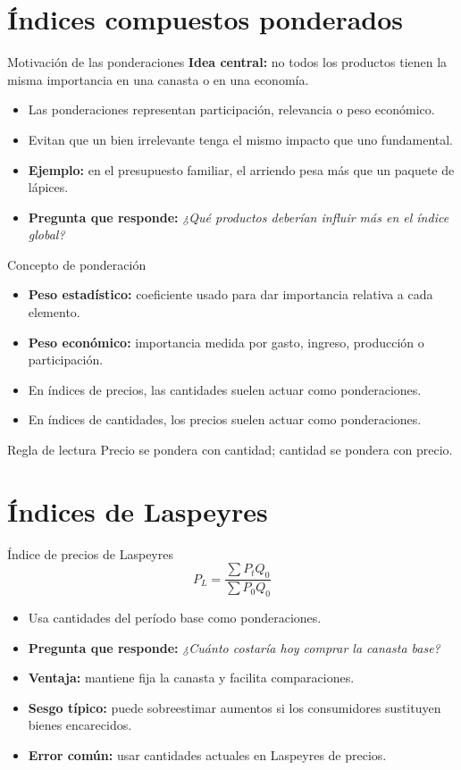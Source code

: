 \documentclass[aspectratio=169,11pt]{beamer}
\newcommand{\pregunta}[1]{\textbf{Pregunta que responde:} \emph{#1}}
\newcommand{\errorcomun}[1]{\textbf{Error común:} #1}
\begin{document}
\section{Índices compuestos ponderados}

\begin{frame}{Motivación de las ponderaciones}
\textbf{Idea central:} no todos los productos tienen la misma importancia en una canasta o en una economía.
\begin{itemize}
  \item Las ponderaciones representan participación, relevancia o peso económico.
  \item Evitan que un bien irrelevante tenga el mismo impacto que uno fundamental.
  \item \textbf{Ejemplo:} en el presupuesto familiar, el arriendo pesa más que un paquete de lápices.
  \item \pregunta{¿Qué productos deberían influir más en el índice global?}
\end{itemize}
\end{frame}

\begin{frame}{Concepto de ponderación}
\begin{itemize}
  \item \textbf{Peso estadístico:} coeficiente usado para dar importancia relativa a cada elemento.
  \item \textbf{Peso económico:} importancia medida por gasto, ingreso, producción o participación.
  \item En índices de precios, las cantidades suelen actuar como ponderaciones.
  \item En índices de cantidades, los precios suelen actuar como ponderaciones.
\end{itemize}
\begin{block}{Regla de lectura}
Precio se pondera con cantidad; cantidad se pondera con precio.
\end{block}
\end{frame}

\section{Índices de Laspeyres}

\begin{frame}{Índice de precios de Laspeyres}
\[
P_L=\frac{\sum P_tQ_0}{\sum P_0Q_0}
\]
\begin{itemize}
  \item Usa cantidades del período base como ponderaciones.
  \item \pregunta{¿Cuánto costaría hoy comprar la canasta base?}
  \item \textbf{Ventaja:} mantiene fija la canasta y facilita comparaciones.
  \item \textbf{Sesgo típico:} puede sobreestimar aumentos si los consumidores sustituyen bienes encarecidos. 
  \item \errorcomun{usar cantidades actuales en Laspeyres de precios.}
\end{itemize}
\end{frame}
\end{document}
